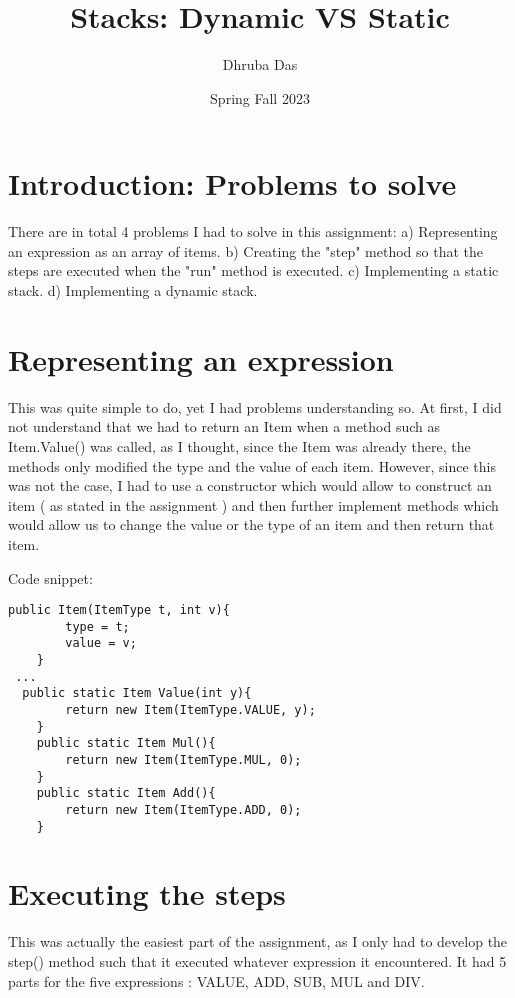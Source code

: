 \documentclass[a4paper,11pt]{article}
\begin{document}
\title{
    \textbf{Stacks: Dynamic VS Static}
}
\author{Dhruba Das}
\date{Spring Fall 2023}

\maketitle

\section*{Introduction: Problems to solve}

There are in total 4 problems I had to solve in this assignment: 
a) Representing an expression as an array of items.
b) Creating the "step" method so that the steps are executed when the "run" method is executed. 
c) Implementing a static stack.
d) Implementing a dynamic stack.

\section*{Representing an expression}

This was quite simple to do, yet I had problems understanding so. At first, I did not understand that we had to return an Item when a method such as Item.Value() was called, as I thought, since the Item was already there, the methods only modified the type and the value of each item. However, since this was not the case, I had to use a constructor which would allow to construct an item ( as stated in the assignment ) and then further implement methods which would allow us to change the value or the type of an item and then return that item.

Code snippet:
\begin{verbatim}
public Item(ItemType t, int v){
        type = t;
        value = v;
    }
 ...
  public static Item Value(int y){
        return new Item(ItemType.VALUE, y);
    }
    public static Item Mul(){
        return new Item(ItemType.MUL, 0);
    }
    public static Item Add(){
        return new Item(ItemType.ADD, 0);
    }
\end{verbatim}

\section*{Executing the steps}
This was actually the easiest part of the assignment, as I only had to develop the step() method such that it executed whatever expression it encountered. It had 5 parts for the five expressions : VALUE, ADD, SUB, MUL and DIV.
\end{document}
